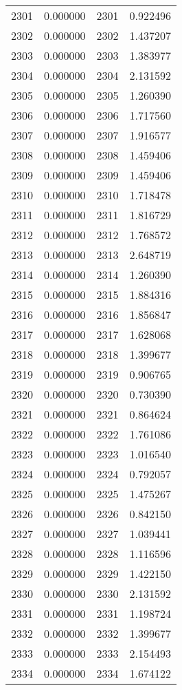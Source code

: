 \documentclass[12pt]{article}
\begin{document}
\begin{longtable}{@{}cccc@{}}
2301 & 0.000000 & 2301 & 0.922496 \\
2302 & 0.000000 & 2302 & 1.437207 \\
2303 & 0.000000 & 2303 & 1.383977 \\
2304 & 0.000000 & 2304 & 2.131592 \\
2305 & 0.000000 & 2305 & 1.260390 \\
2306 & 0.000000 & 2306 & 1.717560 \\
2307 & 0.000000 & 2307 & 1.916577 \\
2308 & 0.000000 & 2308 & 1.459406 \\
2309 & 0.000000 & 2309 & 1.459406 \\
2310 & 0.000000 & 2310 & 1.718478 \\
2311 & 0.000000 & 2311 & 1.816729 \\
2312 & 0.000000 & 2312 & 1.768572 \\
2313 & 0.000000 & 2313 & 2.648719 \\
2314 & 0.000000 & 2314 & 1.260390 \\
2315 & 0.000000 & 2315 & 1.884316 \\
2316 & 0.000000 & 2316 & 1.856847 \\
2317 & 0.000000 & 2317 & 1.628068 \\
2318 & 0.000000 & 2318 & 1.399677 \\
2319 & 0.000000 & 2319 & 0.906765 \\
2320 & 0.000000 & 2320 & 0.730390 \\
2321 & 0.000000 & 2321 & 0.864624 \\
2322 & 0.000000 & 2322 & 1.761086 \\
2323 & 0.000000 & 2323 & 1.016540 \\
2324 & 0.000000 & 2324 & 0.792057 \\
2325 & 0.000000 & 2325 & 1.475267 \\
2326 & 0.000000 & 2326 & 0.842150 \\
2327 & 0.000000 & 2327 & 1.039441 \\
2328 & 0.000000 & 2328 & 1.116596 \\
2329 & 0.000000 & 2329 & 1.422150 \\
2330 & 0.000000 & 2330 & 2.131592 \\
2331 & 0.000000 & 2331 & 1.198724 \\
2332 & 0.000000 & 2332 & 1.399677 \\
2333 & 0.000000 & 2333 & 2.154493 \\
2334 & 0.000000 & 2334 & 1.674122 \\

\end{longtable}
\end{document}
